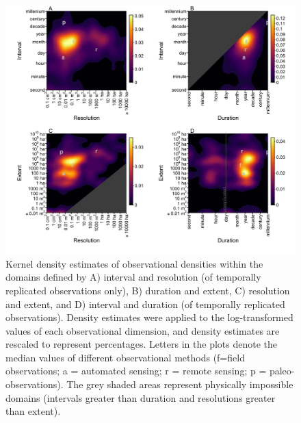\documentclass[12pt]{article}
\begin{document}
\begin{figure}[!ht]
\includegraphics[width=1\textwidth]{../vignettes/figures/fig2.png}
\vspace{-0.15 cm}
\caption{Kernel density estimates of observational densities within the domains defined by A) interval and resolution (of temporally replicated observations only), B) duration and extent, C) resolution and extent, and D) interval and duration (of temporally replicated observations). Density estimates were applied to the log-transformed values of each observational dimension, and density estimates are rescaled to represent percentages. Letters in the plots denote the median values of different observational methods (f=field observations; a = automated sensing; r = remote sensing; p = paleo-observations). The grey shaded areas represent physically impossible domains (intervals greater than duration and resolutions greater than extent).}
\label{afoto1}
\end{figure}
\end{document}
